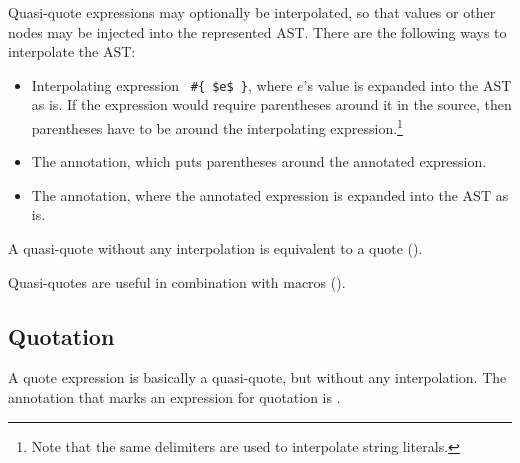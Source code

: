 Quasi-quote expressions may optionally be interpolated, so that values or other nodes may be injected into the represented AST. There are the following ways to interpolate the AST:
\begin{itemize}
\item Interpolating expression ~\lstinline!#{ $e$ }!, where $e$'s value is expanded into the AST as is. If the expression would require parentheses around it in the source, then parentheses have to be around the interpolating expression.\footnote{Note that the same delimiters are used to interpolate string literals.}
\item The  annotation, which puts parentheses around the annotated expression. 
\item The  annotation, where the annotated expression is expanded into the AST as is. 
\end{itemize}

A quasi-quote without any interpolation is equivalent to a quote (). 

Quasi-quotes are useful in combination with macros (). 






\subsection{Quotation}
\label{sec:quotation}

A quote expression is basically a quasi-quote, but without any interpolation. The annotation that marks an expression for quotation is . 















